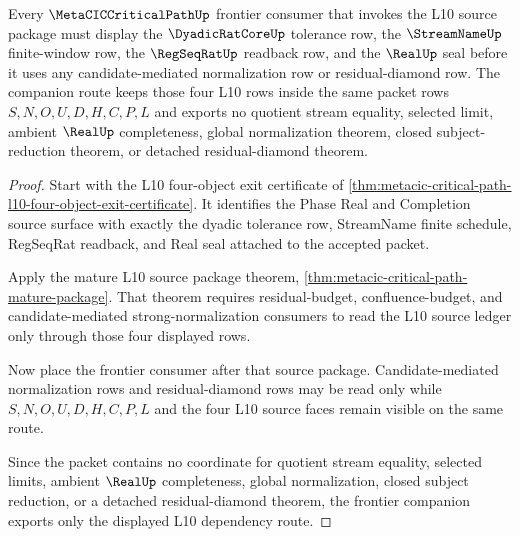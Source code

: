 \begin{theorem}
\label{thm:metacic-critical-path-frontier-companion}
Every $\MetaCICCriticalPathUp$ frontier consumer that invokes the L10 source package must display the $\DyadicRatCoreUp$ tolerance row, the $\StreamNameUp$ finite-window row, the $\RegSeqRatUp$ readback row, and the $\RealUp$ seal before it uses any candidate-mediated normalization row or residual-diamond row. The companion route keeps those four L10 rows inside the same packet rows $S,N,O,U,D,H,C,P,L$ and exports no quotient stream equality, selected limit, ambient $\RealUp$ completeness, global normalization theorem, closed subject-reduction theorem, or detached residual-diamond theorem.
\end{theorem}
\begin{proof}
Start with the L10 four-object exit certificate of \autoref{thm:metacic-critical-path-l10-four-object-exit-certificate}. It identifies the Phase Real and Completion source surface with exactly the dyadic tolerance row, StreamName finite schedule, RegSeqRat readback, and Real seal attached to the accepted packet.

Apply the mature L10 source package theorem, \autoref{thm:metacic-critical-path-mature-package}. That theorem requires residual-budget, confluence-budget, and candidate-mediated strong-normalization consumers to read the L10 source ledger only through those four displayed rows.

Now place the frontier consumer after that source package. Candidate-mediated normalization rows and residual-diamond rows may be read only while $S,N,O,U,D,H,C,P,L$ and the four L10 source faces remain visible on the same route.

Since the packet contains no coordinate for quotient stream equality, selected limits, ambient $\RealUp$ completeness, global normalization, closed subject reduction, or a detached residual-diamond theorem, the frontier companion exports only the displayed L10 dependency route.
\end{proof}
